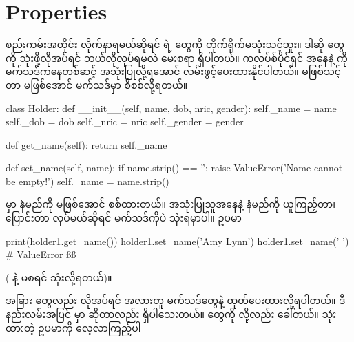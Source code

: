 \section{Properties}
 စည်းကမ်းအတိုင်း လိုက်နာရမယ်ဆိုရင်  ရဲ့  တွေကို တိုက်ရိုက်မသုံးသင့်ဘူး။ ဒါဆို  တွေကို သုံးဖို့လိုအပ်ရင် ဘယ်လိုလုပ်ရမလဲ မေးစရာ ရှိပါတယ်။ ကလပ်စ်ပိုင်ရှင် အနေနဲ့  ကို မက်သဒ်ကနေတစ်ဆင့် အသုံးပြုလို့ရအောင် လမ်းဖွင့်ပေးထားနိုင်ပါတယ်။ မဖြစ်သင့်တာ မဖြစ်အောင် မက်သဒ်မှာ စိစစ်လို့ရတယ်။ 
%
\begin{py}
class Holder:
    def __init__(self, name, dob, nric, gender):
        self._name = name
        self._dob = dob
        self._nric = nric
        self._gender = gender

    def get_name(self):
        return self._name

    def set_name(self, name):
        if name.strip() == '':
            raise ValueError('Name cannot be empty!')
        self._name = name.strip()
\end{py}
%
 မှာ နံမည်ကို  မဖြစ်အောင် စစ်ထားတယ်။ အသုံးပြုသူအနေနဲ့ နံမည်ကို ယူကြည့်တာ၊ ပြောင်းတာ လုပ်မယ်ဆိုရင် မက်သဒ်ကိုပဲ သုံးရမှာပါ။ ဥပမာ
%
\begin{py}
print(holder1.get_name())
holder1.set_name('Amy Lynn')
holder1.set_name('    ')        # ValueError ßß
\end{py}
%
(\fCode{\_} နဲ့ မစရင်  သုံးလို့ရတယ်)။

အခြား  တွေလည်း လိုအပ်ရင် အလားတူ မက်သဒ်တွေနဲ့   ထုတ်ပေးထားလို့ရပါတယ်။ ဒီနည်းလမ်းအပြင်  မှာ   ဆိုတာလည်း ရှိပါသေးတယ်။  တွေကို  လို့လည်း ခေါ်တယ်။  သုံးထားတဲ့ ဥပမာကို လေ့လာကြည့်ပါ

